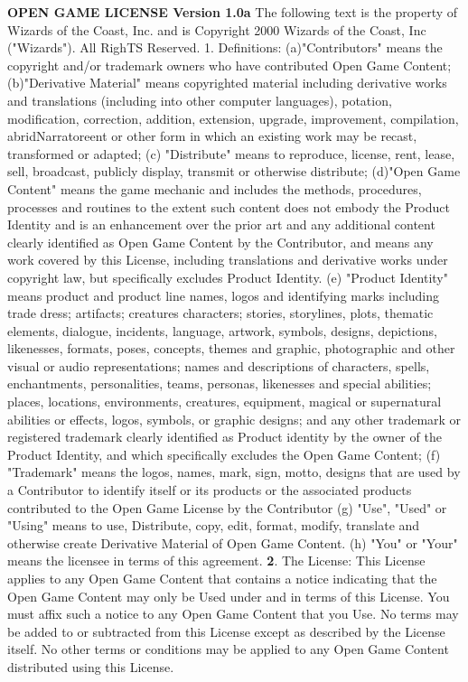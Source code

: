 \documentclass[a4paper,11pt,twoside,openany]{dndbook}
\begin{document}
{\small 
\textbf{OPEN GAME LICENSE Version 1.0a}
The following text is the property of Wizards of the Coast, Inc. and is Copyright 2000 Wizards of the Coast, Inc ("Wizards"). All RighTS Reserved.
1. Definitions: (a)"Contributors" means the copyright and/or trademark owners who have contributed Open Game Content; (b)"Derivative Material" means copyrighted material including derivative works and translations (including into other computer languages), potation, modification, correction, addition, extension, upgrade, improvement, compilation, abridNarratoreent or other form in which an existing work may be recast, transformed or adapted; (c) "Distribute" means to reproduce, license, rent, lease, sell, broadcast, publicly display, transmit or otherwise distribute; (d)"Open Game Content" means the game mechanic and includes the methods, procedures, processes and routines to the extent such content does not embody the Product Identity and is an enhancement over the prior art and any additional content clearly identified as Open Game Content by the Contributor, and means any work covered by this License, including translations and derivative works under copyright law, but specifically excludes Product Identity. (e) "Product Identity" means product and product line names, logos and identifying marks including trade dress; artifacts; creatures characters; stories, storylines, plots, thematic elements, dialogue, incidents, language, artwork, symbols, designs, depictions, likenesses, formats, poses, concepts, themes and graphic, photographic and other visual or audio representations; names and descriptions of characters, spells, enchantments, personalities, teams, personas, likenesses and special abilities; places, locations, environments, creatures, equipment, magical or supernatural abilities or effects, logos, symbols, or graphic designs; and any other trademark or registered trademark clearly identified as Product identity by the owner of the Product Identity, and which specifically excludes the Open Game Content; (f) "Trademark" means the logos, names, mark, sign, motto, designs that are used by a Contributor to identify itself or its products or the associated products contributed to the Open Game License by the Contributor (g) "Use", "Used" or "Using" means to use, Distribute, copy, edit, format, modify, translate and otherwise create Derivative Material of Open Game Content. (h) "You" or "Your" means the licensee in terms of this agreement.
\textbf{2}. The License: This License applies to any Open Game Content that contains a notice indicating that the Open Game Content may only be Used under and in terms of this License. You must affix such a notice to any Open Game Content that you Use. No terms may be added to or subtracted from this License except as described by the License itself. No other terms or conditions may be applied to any Open Game Content distributed using this License.
}
\end{document}
